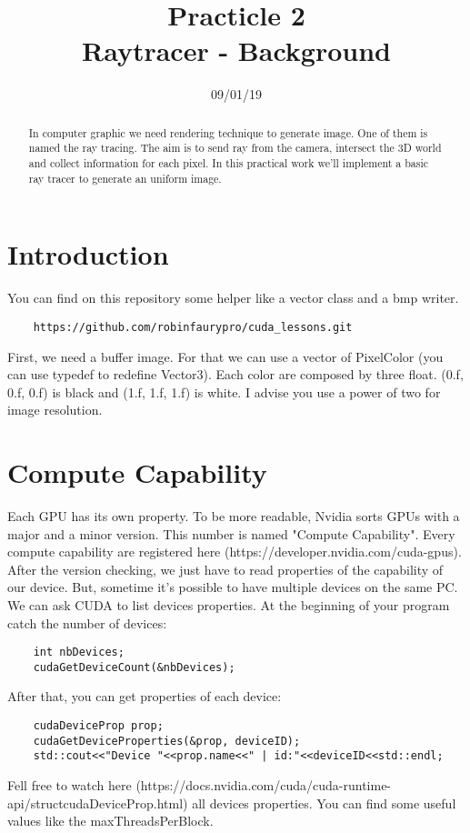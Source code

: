 \documentclass{article}
\begin{document}
\title{Practicle 2\\Raytracer - Background}
\date{09/01/19}
\maketitle

\begin{abstract}
	In computer graphic we need rendering technique to generate image. One of them is named the ray tracing. The aim is to send ray from the camera, intersect the 3D world and collect information for each pixel. In this practical work we'll implement a basic ray tracer to generate an uniform image.
\end{abstract}

\section{Introduction}
You can find on this repository some helper like a vector class and a bmp writer.
\begin{lstlisting}
	https://github.com/robinfaurypro/cuda_lessons.git
\end{lstlisting}
First, we need a buffer image. For that we can use a vector of PixelColor (you can use typedef to redefine Vector3). Each color are composed by three float. (0.f, 0.f, 0.f) is black and (1.f, 1.f, 1.f) is white. I advise you use a power of two for image resolution.

\section{Compute Capability}
Each GPU has its own property. To be more readable, Nvidia sorts GPUs with a major and a minor version. This number is named "Compute Capability". Every compute capability are registered here (https://developer.nvidia.com/cuda-gpus). After the version checking, we just have to read properties of the capability of our device. But, sometime it's possible to have multiple devices on the same PC. We can ask CUDA to list devices properties. At the beginning of your program catch the number of devices:
\begin{lstlisting}
	int nbDevices;
	cudaGetDeviceCount(&nbDevices);
\end{lstlisting}
After that, you can get properties of each device:
\begin{lstlisting}
	cudaDeviceProp prop;
	cudaGetDeviceProperties(&prop, deviceID);
	std::cout<<"Device "<<prop.name<<" | id:"<<deviceID<<std::endl;
\end{lstlisting}
Fell free to watch here (https://docs.nvidia.com/cuda/cuda-runtime-api/structcudaDeviceProp.html) all devices properties. You can find some useful values like the maxThreadsPerBlock. 
\end{document}
